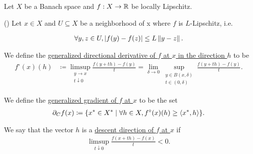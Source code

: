 Let $X$ be a Banach space and $f: X \to \mathbb{R}$ be locally Lipschitz.

\begin{definition}(\cite[195]{Clarke2013})
\label{def:analysis:nonsmooth:generalized_gradient}
  Let $x \in X$ and $U \subseteq X$ be a neighborhood of x where $f$ is $L$-Lipschitz, i.e.

  \begin{align*}
    \forall y, z \in U, \left\vert f(y) - f(z) \right\vert \leq L \left\Vert y - z \right\Vert.
  \end{align*}

  We define the \uline{generalized directional derivative of $f$ at $x$ in the direction $h$} to be
  \begin{align*}
    f^\circ(x)(h)
    &\coloneqq
    \limsup_{\substack{y \to x \\ t \downarrow 0}} \frac {f(y + th) - f(y)} t
    =
    \lim_{\delta \to 0} \sup_{\substack{y \in B(x, \delta) \\ t \in (0, \delta)}} \frac {f(y + th) - f(y)} t.
  \end{align*}


  We define the \uline{generalized gradient of $f$ at $x$} to be the set
  \begin{align*}
    \partial_C f(x) \coloneqq \{ x^* \in X^* \mid \forall h \in X, f^\circ(x)(h) \geq \left\langle x^*, h \right\rangle \}.
  \end{align*}

  We say that the vector $h$ is a \uline{descent direction of $f$ at $x$} if
  \begin{align*}
    \limsup_{t \downarrow 0} \frac {f(x + th) - f(x)} t < 0.
  \end{align*}
\end{definition}
